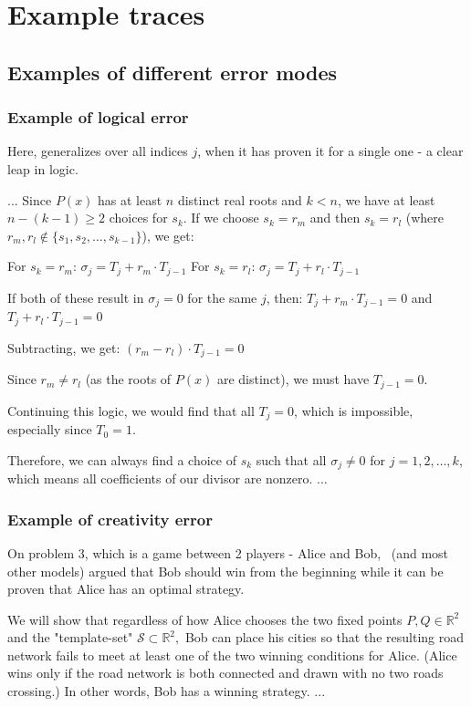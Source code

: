 \section{Example traces}

\subsection{Examples of different error modes}
\label{app:error_mode_examples}

\subsubsection{Example of logical error}
Here, \claude{} generalizes over all indices $j$, when it has proven it for a single one - a clear leap in logic.
\begin{claudels}{\claudeheader}
...
Since $P(x)$ has at least $n$ distinct real roots and $k < n$, we have at least $n-(k-1) \geq 2$ choices for $s_k$. If we choose $s_k = r_m$ and then $s_k = r_l$ (where $r_m, r_l \not\in \{s_1, s_2, \ldots, s_{k-1}\}$), we get:

For $s_k = r_m$: $\sigma_j = T_j + r_m \cdot T_{j-1}$
For $s_k = r_l$: $\sigma_j = T_j + r_l \cdot T_{j-1}$

If both of these result in $\sigma_j = 0$ for the same $j$, then:
$T_j + r_m \cdot T_{j-1} = 0$ and $T_j + r_l \cdot T_{j-1} = 0$

Subtracting, we get: $(r_m - r_l) \cdot T_{j-1} = 0$

Since $r_m \neq r_l$ (as the roots of $P(x)$ are distinct), we must have $T_{j-1} = 0$.

Continuing this logic, we would find that all $T_j = 0$, which is impossible, especially since $T_0 = 1$.

Therefore, we can always find a choice of $s_k$ such that all $\sigma_j \neq 0$ for $j=1,2,\ldots,k$, which means all coefficients of our divisor are nonzero.
...
\end{claudels}

\subsubsection{Example of creativity error}
On problem 3, which is a game between 2 players - Alice and Bob, \othree~(and most other models) argued that Bob should win from the beginning while it can be proven that Alice has an optimal strategy.
\begin{gpt}{\othreeheader}
We will show that regardless of how Alice chooses the two fixed points $P,Q\in\mathbb{R}^2$ and the "template-set" $\mathcal{S}\subset\mathbb{R}^2,$ Bob can place his cities so that the resulting road network fails to meet at least one of the two winning conditions for Alice. (Alice wins only if the road network is both connected and drawn with no two roads crossing.) In other words, Bob has a winning strategy.
...
\end{gpt}

